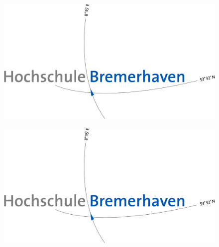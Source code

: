 \begin{figure}[H]
    \centering
    \begin{minipage}{.47\textwidth}
      \centering
      \includegraphics[width=\textwidth]{images/hb_logo_2c.jpg}
      \label{fig:hslogoLeft}
    \end{minipage}
    \hspace{.05\textwidth}%
    \begin{minipage}{.47\textwidth}
        \centering
        \includegraphics[width=\textwidth]{images/hb_logo_2c.jpg}
        \label{fig:hslogoRight}
      \end{minipage}
\end{figure}